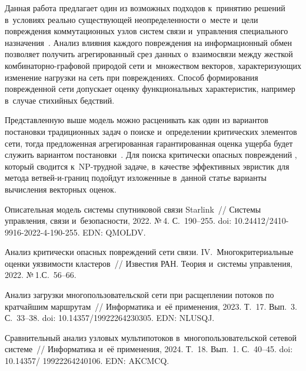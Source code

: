 \begin{multicols}{2}
Данная работа предлагает один из возможных подходов к~принятию решений 
в~условиях реально существующей неопределенности о~месте и~цели по\-вреж\-де\-ния 
коммутационных  узлов  систем связи и~управ\-ле\-ния специального назначения~\cite{Starlink}.
Анализ влияния каждого по\-вреж\-де\-ния на информационный обмен позволяет получить 
агрегированный срез данных о~взаимосвязи между жесткой ком\-би\-на\-тор\-но-гра\-фо\-вой 
природой сети и~множеством векторов,  ха\-рак\-те\-ри\-зу\-ющих  изменение нагрузки  на 
сеть  при по\-вреж\-де\-ни\-ях. Способ формирования по\-вреж\-де\-нной сети допускает оценку 
функциональных характеристик, например в~случае стихийных бедствий.

Представленную выше модель можно расценивать как один из вариантов постановки 
традиционных  задач о поиске и~определении критических элементов сети, тогда 
предложенная агрегированная гарантированная  оценка ущерба будет служить 
вариантом  постановки~\cite{Ponton}.  Для поиска критически опасных по\-вреж\-де\-ний 
\cite{Kuhle}, который сводится к~NP-\mbox{труд}\-ной задаче, в~качестве эффективных 
эвристик для метода вет\-вей-и-гра\-ниц подойдут изложенные в~данной статье варианты 
вычисления векторных оценок.  

{\small\frenchspacing
 {\baselineskip=11.5pt
 \begin{thebibliography}{99}    
 Описательная модель системы спутниковой связи Starlink~// 
Сис\-те\-мы управ\-ле\-ния, связи и~безопас\-ности, 2022. №\,4. С.~190--255. doi: 10.24412/2410-9916-2022-4-190-255. EDN: QMOLDV.

 Анализ критически 
опасных по\-вреж\-де\-ний сети связи. IV.~Многокритериальные оценки уязвимости 
кластеров~// Из\-вес\-тия РАН. Тео\-рия и~сис\-те\-мы управ\-ле\-ния, 2022.  №\,1.\linebreak С.~56--66.
    


 Анализ загрузки  
многопользовательской сети при расщеплении потоков по кратчайшим маршрутам~// 
Информатика и~её применения, 2023. Т.~17. Вып.~3. С.~33--38.
doi: 10.14357/19922264230305. EDN: NLUSQJ.

 Сравнительный 
анализ узловых мультипотоков в~многопользовательской сетевой сис\-те\-ме~//  
Информатика и~её применения, 2024. Т.~18. Вып.~1. С.~40--45. doi: 10.14357/ 19922264240106. EDN: AKCMCQ.


\end{thebibliography}}}
\end{multicols}
